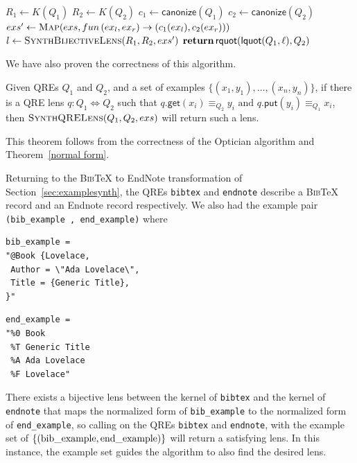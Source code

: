 \documentclass[acmsmall,review,anonymous]{acmart}
\newcommand{\codefont}[1]{\ensuremath{\mathsf{#1}}}
\newcommand{\kw}[1]{\codefont{#1}}
\newcommand{\canonize}{\ensuremath{\kw{canonize}}}
\newcommand{\bibtex}{\textsc{Bib}\TeX{}}
\newcommand{\get}{\ensuremath{\kw{get}}}
\newcommand{\lput}{\ensuremath{\kw{put}}}
\newcommand{\lquot}{\ensuremath{\kw{lquot}}}
\newcommand{\rquot}{\ensuremath{\kw{rquot}}}
\newcommand{\cd}[1]{\lstinline[backgroundcolor=\color{white}]$#1$}
\begin{document}
\begin{algorithm}
  \caption{}
  \label{alg:synthqrelens}
  \begin{algorithmic}[1]
    \State $R_1 \gets K(Q_1)$
    \State $R_2 \gets K(Q_2)$
    \State $c_1 \gets \canonize(Q_1)$
    \State $c_2 \gets \canonize(Q_2)$
    \State $exs' \gets \Call{Map}{exs,fun \, (ex_l,ex_r) \to
      (c_1(ex_l),c_2(ex_r))}$
    \State $l \gets \Call{SynthBijectiveLens}{R_1,R_2,exs'}$
    \State $\Return \, \rquot(\lquot(Q_1, \ell), Q_2)$
    \EndFunction
  \end{algorithmic}
\end{algorithm}

\noindent
We have also proven the correctness of this algorithm.
\begin{theorem}\label{thm:alg-correct}
  Given QREs $Q_1$ and $Q_2$, and a set of examples
  $\{(x_1,y_1),\ldots,(x_n,y_n)\}$, if there is a QRE lens $q : Q_1
  \Leftrightarrow Q_2$ such that $q.\get(x_i) \equiv_{Q_2} y_i \text{ and }
q.\lput(y_i) \equiv_{Q_1} x_i$, then $\textproc{SynthQRELens}(Q_1,Q_2,exs)$ will
return such a lens.
\end{theorem}

\noindent
This theorem follows from the correctness of the Optician algorithm and
Theorem~\ref{normal form}.

Returning to the \bibtex{} to EndNote transformation of
Section~\ref{sec:examplesynth}, the QREs \cd{bibtex} and \cd{endnote}
describe a \bibtex{} record and an Endnote record respectively. We also had
the example pair \cd{(bib_example , end_example)} where

\begin{center}
\begin{minipage}{2.5in}
\begin{lstlisting}
bib_example =
"@Book {Lovelace,
 Author = \"Ada Lovelace\",
 Title = {Generic Title},
}"
\end{lstlisting}
\end{minipage}
\begin{minipage}{1.5in}
\begin{lstlisting}
end_example =
"%0 Book
 %T Generic Title
 %A Ada Lovelace
 %F Lovelace"
\end{lstlisting}
\end{minipage}
\end{center}

There exists a bijective lens between the kernel of \cd{bibtex} and the kernel
of \cd{endnote} that maps the normalized form of \cd{bib_example} to the
normalized form of \cd{end_example}, so calling  on the
QREs \cd{bibtex} and \cd{endnote}, with the example set of
$\{(\text{\cd{bib\_example}},\text{\cd{end\_example}})\}$ will return a
satisfying lens. In this instance, the example set guides the algorithm to also
find the desired lens.
\end{document}
